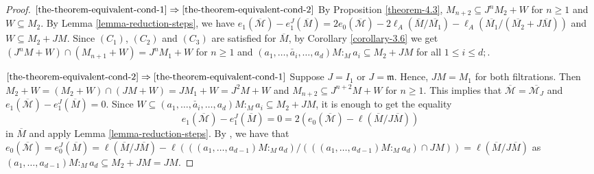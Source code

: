 \documentclass[11pt,reqno]{amsart}
\theoremstyle{definition}
\newcommand{\m}{\mathfrak m}
\def\M{{\mathcal M}}
\numberwithin{equation}{section}
\begin{document}
\begin{proof}
 $\eqref{the-theorem-equivalent-cond-1}\Rightarrow \eqref{the-theorem-equivalent-cond-2}$ By Proposition \ref{theorem-4.3},  $M_{n+2}\subseteq J^n M_2+W$ for $n\geq 1$ and $W\subseteq M_2$. By Lemma \ref{lemma-reduction-steps}, we have $e_1(\overline{\M})-e_1^J(\overline{M})=2e_0(\overline{\M})-2\ell_A(\overline{M}/\overline{M_1} )-\ell_A(\overline{M_1} /(\overline{M_2} +J\overline{M}))$
and $W\subseteq M_2+JM$. Since 
$(C_1)$, $(C_2)$ and $(C_3)$ are satisfied for $\overline{M}$, by Corollary \ref{corollary-3.6} we get $(J^nM+W)\cap (M_{n+1}+W)=J^nM_1+W$ for $n\geq 1$ and 
$(a_1,\ldots,\check{a_i},\ldots,a_d)M:_M a_i\subseteq M_2+JM$ for all $1\leq i\leq d;$. 

 $\eqref{the-theorem-equivalent-cond-2}\Rightarrow \eqref{the-theorem-equivalent-cond-1}$ 	Suppose $J=I_1$ or $J=\m$. Hence, $JM=M_1$ for both filtrations. Then $M_2+W=(M_2+W)\cap (JM+W)=JM_1+W=J^2M+W$ and $M_{n+2}\subseteq J^{n+2}M+W$ for $n\geq 1.$ This implies that $\overline{\M}=\overline{\M_J}$ and $e_1(\overline{\M})-e_1^J(\overline{M})=0$. Since $W\subseteq (a_1,\ldots,\check{a_i},\ldots,a_d)M:_Ma_i\subseteq M_2+JM$,  it is enough to get the equality $$e_1(\overline{\M} )-e_1^J(\overline{M})=0=2(e_0(\overline{\M})-\ell(\overline{M}/J\overline{M}))$$
	in $\overline{M}$ and apply Lemma \ref{lemma-reduction-steps}. By \cite[Theorem 4.1]{trung-abs}, we have that $e_0(\overline{\M})=e_0^J(\overline{M})=\ell(\overline{M}/J\overline{M})-\ell(((a_1,\ldots,a_{d-1})M:_Ma_d)/ (((a_1,\dots,a_{d-1})M:_Ma_d)\cap JM))=\ell(\overline{M}/J\overline{M})$ as $(a_1,\ldots,a_{d-1})M:_Ma_d\subseteq M_2+JM=JM.$
	

\end{proof}
\end{document}
